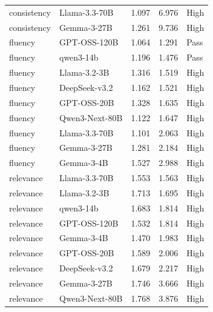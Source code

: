 \begin{table}[t]
{\begin{tabular}{llrrl}
consistency & Llama-3.3-70B & 1.097 & 6.976 & High \\
consistency & Gemma-3-27B & 1.261 & 9.736 & High \\
fluency & GPT-OSS-120B & 1.064 & 1.291 & Pass \\
fluency & qwen3-14b & 1.196 & 1.476 & Pass \\
fluency & Llama-3.2-3B & 1.316 & 1.519 & High \\
fluency & DeepSeek-v3.2 & 1.162 & 1.521 & High \\
fluency & GPT-OSS-20B & 1.328 & 1.635 & High \\
fluency & Qwen3-Next-80B & 1.122 & 1.647 & High \\
fluency & Llama-3.3-70B & 1.101 & 2.063 & High \\
fluency & Gemma-3-27B & 1.281 & 2.184 & High \\
fluency & Gemma-3-4B & 1.527 & 2.988 & High \\
relevance & Llama-3.3-70B & 1.553 & 1.563 & High \\
relevance & Llama-3.2-3B & 1.713 & 1.695 & High \\
relevance & qwen3-14b & 1.683 & 1.814 & High \\
relevance & GPT-OSS-120B & 1.532 & 1.814 & High \\
relevance & Gemma-3-4B & 1.470 & 1.983 & High \\
relevance & GPT-OSS-20B & 1.589 & 2.006 & High \\
relevance & DeepSeek-v3.2 & 1.679 & 2.217 & High \\
relevance & Gemma-3-27B & 1.746 & 3.666 & High \\
relevance & Qwen3-Next-80B & 1.768 & 3.876 & High \\
\bottomrule
\end{tabular}
}
\end{table}